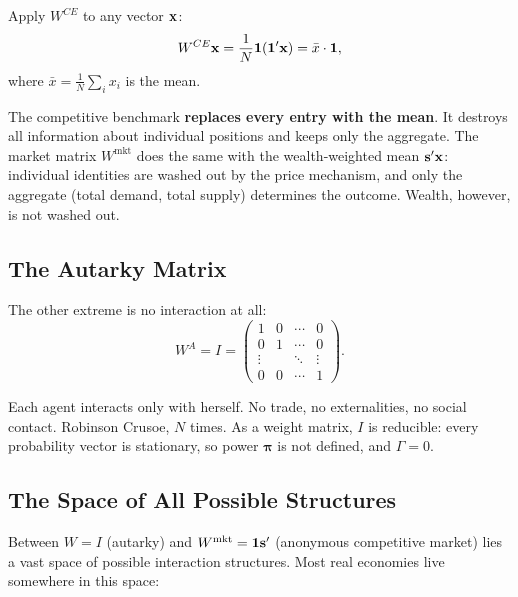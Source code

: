 \documentclass[../structural_economics_book.tex]{subfiles}
\begin{document}
\begin{intuition}
Apply $W^{CE}$ to any vector $\mathbf{x}$:
\begin{equation}
W^{CE}\mathbf{x} = \frac{1}{N}\mathbf{1}(\mathbf{1}'\mathbf{x}) = \bar{x} \cdot \mathbf{1},
\end{equation}
where $\bar{x} = \frac{1}{N}\sum_i x_i$ is the mean.

The competitive benchmark \textbf{replaces every entry with the mean}. It destroys all information about individual positions and keeps only the aggregate. The market matrix $W^{\text{mkt}}$ does the same with the wealth-weighted mean $\mathbf{s}'\mathbf{x}$: individual identities are washed out by the price mechanism, and only the aggregate (total demand, total supply) determines the outcome. Wealth, however, is not washed out.
\end{intuition}


\subsection{The Autarky Matrix}

The other extreme is no interaction at all:
\begin{equation}
W^A = I = \begin{pmatrix} 1 & 0 & \cdots & 0 \\ 0 & 1 & \cdots & 0 \\ \vdots & & \ddots & \vdots \\ 0 & 0 & \cdots & 1 \end{pmatrix}.
\end{equation}

Each agent interacts only with herself. No trade, no externalities, no social contact. Robinson Crusoe, $N$ times. As a weight matrix, $I$ is reducible: every probability vector is stationary, so power $\boldsymbol{\pi}$ is not defined, and $\Gamma = 0$.


\subsection{The Space of All Possible Structures}

Between $W = I$ (autarky) and $W^{\text{mkt}} = \mathbf{1}\mathbf{s}'$ (anonymous competitive market) lies a vast space of possible interaction structures. Most real economies live somewhere in this space:
\end{document}
